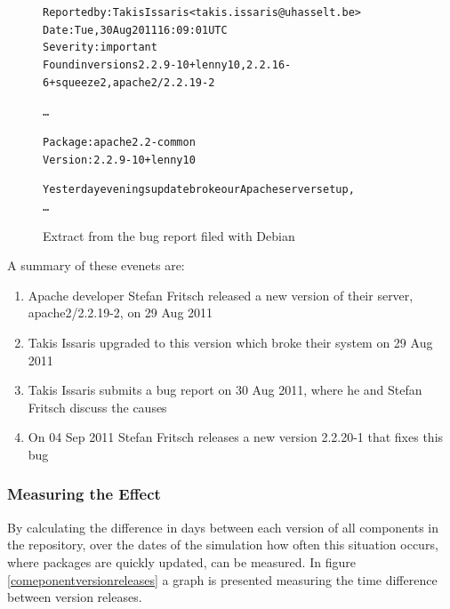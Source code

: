 \begin{figure}[htp]
\begin{center}
\begin{alltt}

Reported by: Takis Issaris <takis.issaris@uhasselt.be>
Date: Tue, 30 Aug 2011 16:09:01 UTC
Severity: important
Found in versions 2.2.9-10+lenny10, 2.2.16-6+squeeze2, apache2/2.2.19-2

\ldots

Package: apache2.2-common
Version: 2.2.9-10+lenny10

Yesterday evenings update broke our Apache server setup,
\ldots
\end{alltt}
\caption[Apache Bug Report]{Extract from the bug report filed with Debian}
\label{apachebug}
\end{center}
\end{figure}

A summary of these evenets are:
\begin{enumerate}
  \item Apache developer Stefan Fritsch released a new version of their server, apache2/2.2.19-2, on 29 Aug 2011
  \item Takis Issaris upgraded to this version which broke their system on 29 Aug 2011
  \item Takis Issaris submits a bug report on 30 Aug 2011, where he and Stefan Fritsch discuss the causes
  \item On 04 Sep 2011 Stefan Fritsch releases a new version 2.2.20-1 that fixes this bug
\end{enumerate}



\subsubsection{Measuring the Effect}
By calculating the difference in days between each version of all components in the repository, 
over the dates of the simulation how often this situation occurs, where packages are quickly updated, can be measured.
In figure \ref{comeponentversionreleases} a graph is presented measuring the time difference between version releases.
 
